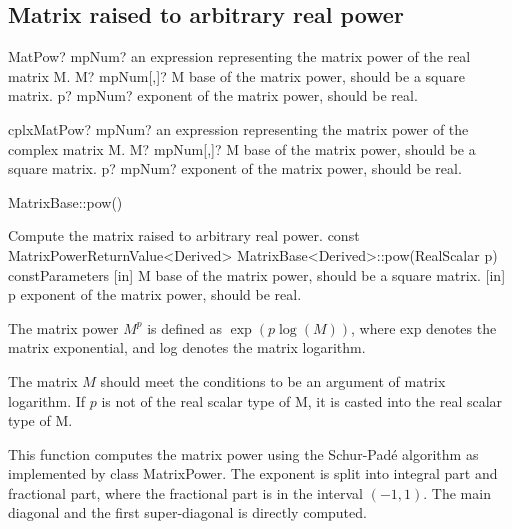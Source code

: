 \newpage
\subsection{Matrix raised to arbitrary real power}


\begin{mpFunctionsExtract}
	\mpFunctionTwo
	{MatPow? mpNum? an expression representing the matrix power of the real matrix M.}
	{M? mpNum[,]? M base of the matrix power, should be a square matrix.}
	{p? mpNum? exponent of the matrix power, should be real.}
\end{mpFunctionsExtract}

\vspace{0.6cm}
\begin{mpFunctionsExtract}
	\mpFunctionTwo
	{cplxMatPow? mpNum? an expression representing the matrix power of the complex matrix M.}
	{M? mpNum[,]? M base of the matrix power, should be a square matrix.}
	{p? mpNum? exponent of the matrix power, should be real.}
\end{mpFunctionsExtract}

%

\vspace{0.3cm}


MatrixBase::pow()



Compute the matrix raised to arbitrary real power.
const MatrixPowerReturnValue<Derived> MatrixBase<Derived>::pow(RealScalar p) constParameters
[in] M base of the matrix power, should be a square matrix.  
[in] p exponent of the matrix power, should be real. 

The matrix power $M^p$ is defined as $\exp(p \log(M))$, where exp denotes the matrix exponential, and log denotes the matrix logarithm.

The matrix $M$ should meet the conditions to be an argument of matrix logarithm. If $p$ is not of the real scalar type of M, it is casted into the real scalar type of M.

This function computes the matrix power using the Schur-Pad\'e algorithm as implemented by class MatrixPower. The exponent is split into integral part and fractional part, where the fractional part is in the interval $(-1,1)$. The main diagonal and the first super-diagonal is directly computed.


